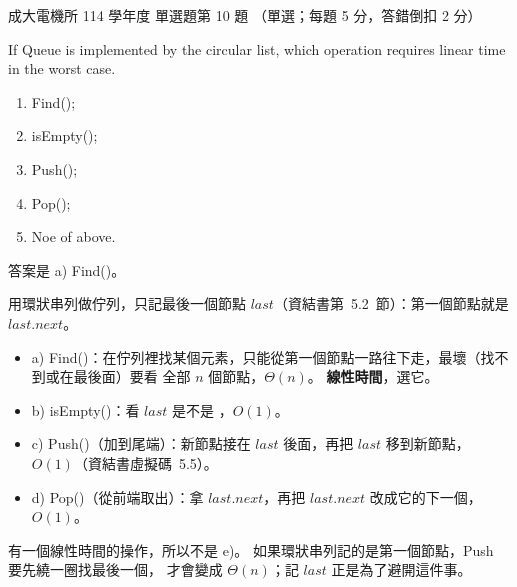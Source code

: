 \begin{pastexam}[label={px:ncku-114-ee-ds-10}]{成大電機所 114 學年度 單選題第 10 題}
（單選；每題 5 分，答錯倒扣 2 分）

If Queue is implemented by the circular list, which operation requires linear time in the worst
case.
\begin{enumerate}[label=\alph*)]
\item Find();
\item isEmpty();
\item Push();
\item Pop();
\item Noe of above.
\end{enumerate}
\end{pastexam}

\begin{pastsoln}
答案是 a) Find()。

用環狀串列做佇列，只記最後一個節點 $\mathit{last}$（資結書第~5.2~節）：第一個節點就是
$\mathit{last}.\mathit{next}$。
\begin{itemize}
\item a) Find()：在佇列裡找某個元素，只能從第一個節點一路往下走，最壞（找不到或在最後面）要看
全部 $n$ 個節點，$\Theta(n)$。 \textbf{線性時間}，選它。
\item b) isEmpty()：看 $\mathit{last}$ 是不是 \NIL，$O(1)$。
\item c) Push()（加到尾端）：新節點接在 $\mathit{last}$ 後面，再把 $\mathit{last}$ 移到新節點，
$O(1)$（資結書虛擬碼~5.5）。
\item d) Pop()（從前端取出）：拿 $\mathit{last}.\mathit{next}$，再把 $\mathit{last}.\mathit{next}$
改成它的下一個，$O(1)$。
\end{itemize}
有一個線性時間的操作，所以不是 e)。 如果環狀串列記的是第一個節點，Push 要先繞一圈找最後一個，
才會變成 $\Theta(n)$；記 $\mathit{last}$ 正是為了避開這件事。
\end{pastsoln}
